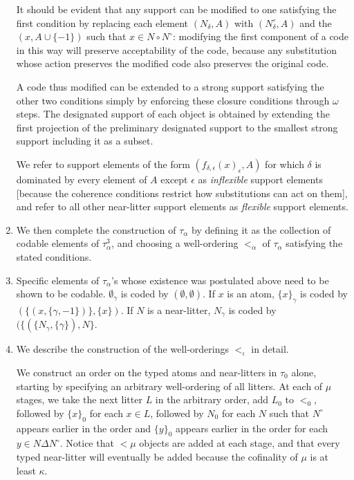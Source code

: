 \documentclass[12pt]{article}
\begin{document}
\begin{enumerate}
\begin{enumerate}
\end{enumerate}  It should be evident that any support can be modified to one satisfying the first condition by replacing each element
$(N_\delta,A)$ with $(N^\circ_\delta,A)$ and the $(x,A\cup \{-1\})$ such that $x \in N \circ N^\circ$:  modifying the first component of a code
in this way will preserve acceptability of the code, because any substitution whose action preserves the modified code also preserves the original code.

A code thus modified can be extended to a strong support satisfying the other two conditions simply by enforcing these closure conditions through $\omega$ steps.  The designated support of each object is obtained by extending the first projection
of the preliminary designated support to the smallest strong support including  it as a subset.

We refer to support elements of the form $(f_{\delta,\epsilon}(x)_\epsilon,A)$ for which $\delta$ is dominated by every element of $A$ except $\epsilon$ as {\em inflexible\/} support elements [because the coherence conditions restrict how substitutions can act on them], and refer to all other near-litter support elements as {\em flexible\/} support elements.

\item  We then complete the construction of $\tau_\alpha$ by defining it as the collection of codable elements of $\tau^3_\alpha$, and choosing a well-ordering $<_\alpha$ of $\tau_\alpha$ satisfying the stated conditions.

\item Specific elements of $\tau_\alpha$'s whose existence was postulated above need to be shown to be codable.  $\emptyset_\gamma$ is coded by $(\emptyset,\emptyset)$.  If $x$ is an atom, $\{x\}_\gamma$ is coded by $(\{(x,\{\gamma,-1\})\},\{x\})$.  If $N$ is a near-litter,
$N_\gamma$ is coded by $(\{(\{N_\gamma,\{\gamma\}),N\}$.

\item  We describe the construction of the well-orderings $<_\iota$ in detail.

We construct an order on the typed atoms and near-litters in $\tau_0$ alone, starting by specifying an arbitrary well-ordering of all litters.  At each of $\mu$ stages,
we take the next litter $L$ in the arbitrary order, add $L_0$ to $<_0$, followed by $\{x\}_0$ for each $x \in L$, followed by $N_0$ for each $N$ such that $N^{\circ}$
appears earlier in the order and $\{y\}_0$ appears earlier in the order for each $y \in N \Delta N^\circ$.  Notice that $<\mu$ objects are added at each stage, and that every typed near-litter will eventually be added because the cofinality of $\mu$ is at least $\kappa$.


\end{enumerate}
\end{document}
